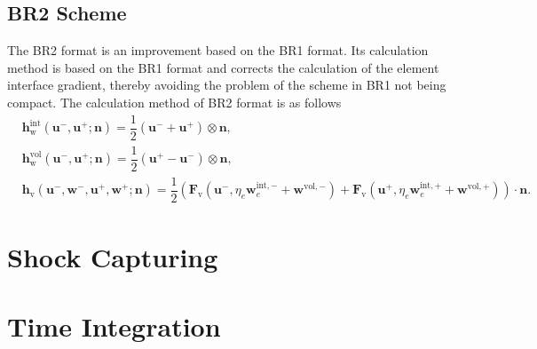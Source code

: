 \documentclass{develop-note}
\begin{document}
\subsection*{BR2 Scheme}

The BR2 format is an improvement based on the BR1 format. Its calculation method is based on the BR1 format and corrects the calculation of the element interface gradient, thereby avoiding the problem of the scheme in BR1 not being compact. The calculation method of BR2 format is as follows
\begin{equation}
  \begin{aligned}
  &\mathbf{h}^{\mathrm{int}}_{\mathrm{w}}(\mathbf{u}^{-},\mathbf{u}^{+};\mathbf{n})=\dfrac{1}{2}(\mathbf{u}^{-}+\mathbf{u}^{+})\otimes\mathbf{n},\\
  &\mathbf{h}^{\mathrm{vol}}_{\mathrm{w}}(\mathbf{u}^{-},\mathbf{u}^{+};\mathbf{n})=\dfrac{1}{2}(\mathbf{u}^{+}-\mathbf{u}^{-})\otimes\mathbf{n},\\
  &\mathbf{h}_{\mathrm{v}}(\mathbf{u}^{-},\mathbf{w}^{-},\mathbf{u}^{+},\mathbf{w}^{+};\mathbf{n})=\dfrac{1}{2}(\mathbf{F}_{\mathrm{v}}(\mathbf{u}^{-},\eta_{e}\mathbf{w}_{e}^{\mathrm{int},-}+\mathbf{w}^{\mathrm{vol},-})+\mathbf{F}_{\mathrm{v}}(\mathbf{u}^{+},\eta_{e}\mathbf{w}_{e}^{\mathrm{int},+}+\mathbf{w}^{\mathrm{vol},+}))\cdot\mathbf{n}.
  \end{aligned}
\end{equation}

\section{Shock Capturing}

\section{Time Integration}
\end{document}
